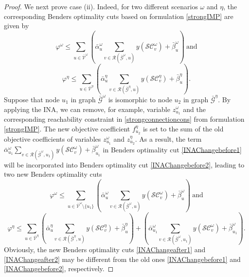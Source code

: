 \documentclass[a4paper,10pt]{article}
\theoremstyle{plain}
\newcommand{\rev}[1]{{\color{black}#1}}
\begin{document}
\begin{proof}
		
		We next prove case (ii). 
		Indeed, for two different scenarios $\omega$ and $\eta$, the corresponding Benders optimality cuts based on formulation \eqref{strongIMP} are given by
		\begin{equation}\label{INAChangebefore1}
			\varphi^{\omega}\leq\sum_{u\in\bar{\mathcal{V}}^{\omega}}\left(\bar{\alpha}_u^{\omega}\sum_{v\in\mathcal{R}(\bar{\mathcal{G}}^{\omega},u)}y(\mathcal{SC}_v^{\omega})+\bar{\beta}_u^{\omega}\right)~\text{and}
		\end{equation}
		\begin{equation}\label{INAChangebefore2}
			\varphi^{\eta}\leq\sum_{u\in\bar{\mathcal{V}}^{\eta}}\left(\bar{\alpha}_u^{\eta}\sum_{v\in\mathcal{R}(\bar{\mathcal{G}}^{\eta},u)}y(\mathcal{SC}_v^{\eta})+\bar{\beta}_u^{\eta}\right).
		\end{equation}
		Suppose that node $u_1$ in graph $\mathcal{\bar{G}}^\omega$ is isomorphic to node $u_2$ in graph $\mathcal{\bar{G}}^{\eta}$. 
		By applying the INA, we can remove, \rev{for example}, variable $z_{u_1}^{\omega}$ and the corresponding reachability constraint in \eqref{strongconnectioncons} from formulation \eqref{strongIMP}.
		The new objective coefficient $f_{u_2}^{\eta}$ is set to the sum of the old objective coefficients of variables $z_{u_1}^{\omega}$ and $z_{u_2}^{\eta}$.
		As a result, the term $\bar{\alpha}_{u_1}^{\omega}\sum_{v\in\mathcal{R}(\bar{\mathcal{G}}^{\omega},u_1)}y(\mathcal{SC}_v^{\omega})+\bar{\beta}_{u_1}^{\omega}$ in Benders optimality cut \eqref{INAChangebefore1}
		will be incorporated into Benders optimality cut \eqref{INAChangebefore2}, leading to two new Benders optimality cuts
		\begin{equation}\label{INAChangeafter1}
			\varphi^{\omega}\leq\sum_{u\in\bar{\mathcal{V}}^{\omega}\setminus \{u_1\}}\left(\bar{\alpha}_u^{\omega}\sum_{v\in\mathcal{R}(\bar{\mathcal{G}}^{\omega},u)}y(\mathcal{SC}_v^{\omega})+\bar{\beta}_u^{\omega}\right)~\text{and}
		\end{equation}
		\begin{equation}\label{INAChangeafter2}
			\varphi^{\eta}\leq\sum_{u\in\bar{\mathcal{V}}^{\eta}}\left(\bar{\alpha}_u^{\eta}\sum_{v\in\mathcal{R}(\bar{\mathcal{G}}^{\eta},u)}y(\mathcal{SC}_v^{\eta})+\bar{\beta}_u^{\eta}\right)+\left(\bar{\alpha}_{u_1}^{\omega}\sum_{v\in\mathcal{R}(\bar{\mathcal{G}}^{\omega},u_1)}y(\mathcal{SC}_v^{\omega})+\bar{\beta}_{u_1}^{\omega}\right).
		\end{equation}
		Obviously, the new Benders optimality cuts \eqref{INAChangeafter1} and \eqref{INAChangeafter2} may be different from the old ones \eqref{INAChangebefore1} and \eqref{INAChangebefore2}, respectively.
	\end{proof}
	
\end{document}
